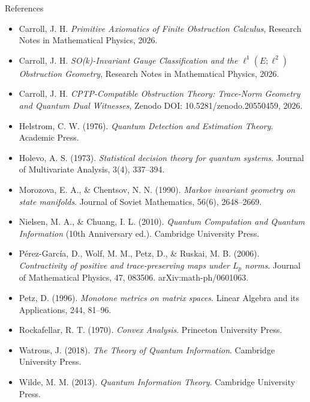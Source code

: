 \documentclass[
  11pt,
]{article}
\providecommand{\tightlist}{%
  \setlength{\itemsep}{0pt}\setlength{\parskip}{0pt}}
\providecommand{\tightlist}{%
  \setlength{\itemsep}{0pt}\setlength{\parskip}{0pt}}
\begin{document}
References

\begin{itemize}
\tightlist
\item
  Carroll, J. H. \emph{Primitive Axiomatics of Finite Obstruction Calculus}, Research Notes in Mathematical Physics, 2026.
\item
  Carroll, J. H. \emph{SO(k)-Invariant Gauge Classification and the \(\ell^1(E;\ell^2)\) Obstruction Geometry}, Research Notes in Mathematical Physics, 2026.
\item
  Carroll, J. H. \emph{CPTP-Compatible Obstruction Theory: Trace-Norm Geometry and Quantum Dual Witnesses}, Zenodo DOI: 10.5281/zenodo.20550459, 2026.
\item
  Helstrom, C. W. (1976). \emph{Quantum Detection and Estimation Theory}. Academic Press.
\item
  Holevo, A. S. (1973). \emph{Statistical decision theory for quantum systems}. Journal of Multivariate Analysis, 3(4), 337--394.
\item
  Morozova, E. A., \& Chentsov, N. N. (1990). \emph{Markov invariant geometry on state manifolds}. Journal of Soviet Mathematics, 56(6), 2648--2669.
\item
  Nielsen, M. A., \& Chuang, I. L. (2010). \emph{Quantum Computation and Quantum Information} (10th Anniversary ed.). Cambridge University Press.
\item
  Pérez-García, D., Wolf, M. M., Petz, D., \& Ruskai, M. B. (2006). \emph{Contractivity of positive and trace-preserving maps under \(L_p\) norms}. Journal of Mathematical Physics, 47, 083506. arXiv:math-ph/0601063.
\item
  Petz, D. (1996). \emph{Monotone metrics on matrix spaces}. Linear Algebra and its Applications, 244, 81--96.
\item
  Rockafellar, R. T. (1970). \emph{Convex Analysis}. Princeton University Press.
\item
  Watrous, J. (2018). \emph{The Theory of Quantum Information}. Cambridge University Press.
\item
  Wilde, M. M. (2013). \emph{Quantum Information Theory}. Cambridge University Press.
\end{itemize}
\end{document}
